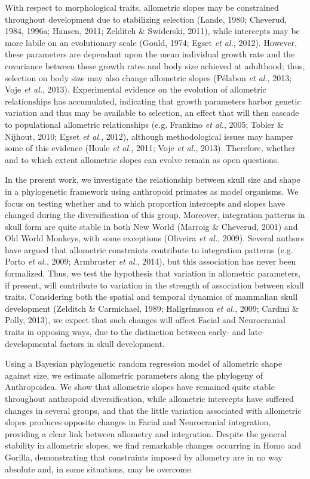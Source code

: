 \documentclass[12pt,]{article}
\begin{document}
With respect to morphological traits, allometric slopes may be
constrained throughout development due to stabilizing selection (Lande,
1980; Cheverud, 1984, 1996a; Hansen, 2011; Zelditch \& Swiderski, 2011),
while intercepts may be more labile on an evolutionary scale (Gould,
1974; Egset \emph{et al.}, 2012). However, these parameters are
dependant upon the mean individual growth rate and the covariance
between these growth rates and body size achieved at adulthood; thus,
selection on body size may also change allometric slopes (Pélabon
\emph{et al.}, 2013; Voje \emph{et al.}, 2013). Experimental evidence on
the evolution of allometric relationships has accumulated, indicating
that growth parameters harbor genetic variation and thus may be
available to selection, an effect that will then cascade to populational
allometric relationships (e.g. Frankino \emph{et al.}, 2005; Tobler \&
Nijhout, 2010; Egset \emph{et al.}, 2012), although methodological
issues may hamper some of this evidence (Houle \emph{et al.}, 2011; Voje
\emph{et al.}, 2013). Therefore, whether and to which extent allometric
slopes can evolve remain as open questions.

In the present work, we investigate the relationship between skull size
and shape in a phylogenetic framework using anthropoid primates as model
organisms. We focus on testing whether and to which proportion
intercepts and slopes have changed during the diversification of this
group. Moreover, integration patterns in skull form are quite stable in
both New World (Marroig \& Cheverud, 2001) and Old World Monkeys, with
some exceptions (Oliveira \emph{et al.}, 2009). Several authors have
argued that allometric constraints contribute to integration patterns
(e.g. Porto \emph{et al.}, 2009; Armbruster \emph{et al.}, 2014), but
this association has never been formalized. Thus, we test the hypothesis
that variation in allometric parameters, if present, will contribute to
variation in the strength of association between skull traits.
Considering both the spatial and temporal dynamics of mammalian skull
development (Zelditch \& Carmichael, 1989; Hallgrímsson \emph{et al.},
2009; Cardini \& Polly, 2013), we expect that such changes will affect
Facial and Neurocranial traits in opposing ways, due to the distinction
between early- and late-developmental factors in skull development.

Using a Bayesian phylogenetic random regression model of allometric
shape against size, we estimate allometric parameters along the
phylogeny of Anthropoidea. We show that allometric slopes have remained
quite stable throughout anthropoid diversification, while allometric
intercepts have suffered changes in several groups, and that the little
variation associated with allometric slopes produces opposite changes in
Facial and Neurocranial integration, providing a clear link between
allometry and integration. Despite the general stability in allometric
slopes, we find remarkable changes occurring in Homo and Gorilla,
demonstrating that constraints imposed by allometry are in no way
absolute and, in some situations, may be overcome.
\end{document}
